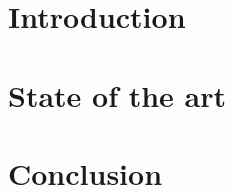 


\usepackage{blkarray}


\begin{refsection}

\chapter[01]{Introduction}
\chapter[02]{State of the art}
\chapter[09]{Conclusion}



\end{refsection}

